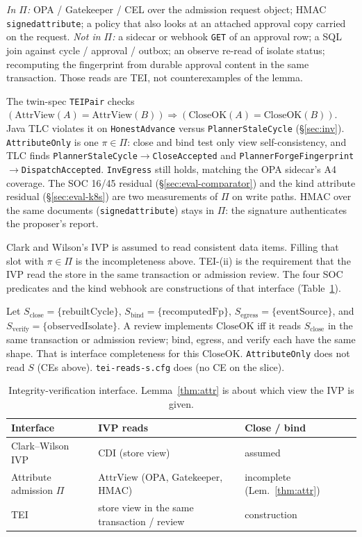 \documentclass[acmsmall,manuscript,review,anonymous]{acmart}
\renewcommand{\_}{\discretionary{\textunderscore}{}{\textunderscore}}
\begin{document}
\emph{In $\Pi$:} {OPA} / Gatekeeper / {CEL} over the admission request
object; {HMAC} \texttt{signed\_attribute}; a policy that also looks at an
attached approval copy carried on the request.
\emph{Not in $\Pi$:} a sidecar or webhook \texttt{GET} of an approval row;
a {SQL} join against cycle / approval / outbox; an observe re-read of
isolate status; recomputing the fingerprint from durable approval content
in the same transaction. Those reads are {TEI}, not counterexamples of
the lemma.

The twin-spec \texttt{TEIPair} checks
$(\mathrm{AttrView}(A)=\mathrm{AttrView}(B))\Rightarrow(\mathrm{CloseOK}(A)=\mathrm{CloseOK}(B))$.
Java {TLC} violates it on \texttt{HonestAdvance} versus
\texttt{PlannerStaleCycle} (\S\ref{sec:inv}).
\texttt{AttributeOnly} is one $\pi\in\Pi$: close and bind test only view
self-consistency, and {TLC} finds
\texttt{PlannerStaleCycle}$\to$\texttt{CloseAccepted} and
\texttt{PlannerForgeFingerprint}\allowbreak$\to$\allowbreak\texttt{DispatchAccepted}.
\texttt{InvEgress} still holds, matching the {OPA} sidecar's A4 coverage.
The {SOC} 16/45 residual (\S\ref{sec:eval-comparator}) and the kind
attribute residual (\S\ref{sec:eval-k8s}) are two measurements of $\Pi$
on write paths. {HMAC} over the same documents
(\texttt{signed\_attribute}) stays in $\Pi$: the signature authenticates
the proposer's report.

Clark and Wilson's {IVP} is assumed to read consistent data items.
Filling that slot with $\pi\in\Pi$ is the incompleteness above.
TEI-(ii) is the requirement that the {IVP} read the store in the same
transaction or admission review. The four {SOC} predicates and the kind
webhook are constructions of that interface
(Table~\ref{tab:cw-ivp}).

Let $S_{\mathrm{close}}=\{\mathrm{rebuiltCycle}\}$,
$S_{\mathrm{bind}}=\{\mathrm{recomputedFp}\}$,
$S_{\mathrm{egress}}=\{\mathrm{eventSource}\}$, and
$S_{\mathrm{verify}}=\{\mathrm{observedIsolate}\}$.
A review implements $\mathrm{CloseOK}$ iff it reads $S_{\mathrm{close}}$
in the same transaction or admission review; bind, egress, and verify
each have the same shape. That is interface completeness for this $\mathrm{CloseOK}$.
\texttt{AttributeOnly} does not read $S$ ({CE}s above).
\texttt{tei-reads-s.cfg} does (no {CE} on the slice).

\begin{table}[t]
\centering
\small
\caption{Integrity-verification interface. Lemma~\ref{thm:attr} is about
which view the {IVP} is given.}
\label{tab:cw-ivp}
\begin{tabular}{@{}lll@{}}
\hline
Interface & {IVP} reads & Close / bind \\
\hline
Clark--Wilson {IVP} & {CDI} (store view) & assumed \\
Attribute admission $\Pi$ & $\mathrm{AttrView}$ ({OPA}, Gatekeeper, {HMAC}) & incomplete (Lem.~\ref{thm:attr}) \\
{TEI} & store view in the same transaction / review & construction \\
\hline
\end{tabular}
\end{table}
\end{document}
